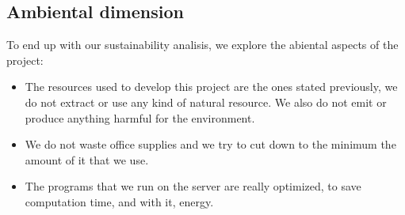 \documentclass{article}
\begin{document}
\subsection{Ambiental dimension}
To end up with our sustainability analisis, we explore the abiental aspects of the project:
\begin{itemize}
    \item The resources used to develop this project are the ones stated previously, we do not extract or use any kind of natural resource. We also do not emit or produce anything harmful for the environment.
    \item We do not waste office supplies and we try to cut down to the minimum the amount of it that we use.
    \item The programs that we run on the server are really optimized, to save computation time, and with it, energy. 
\end{itemize}


\break
\end{document}
